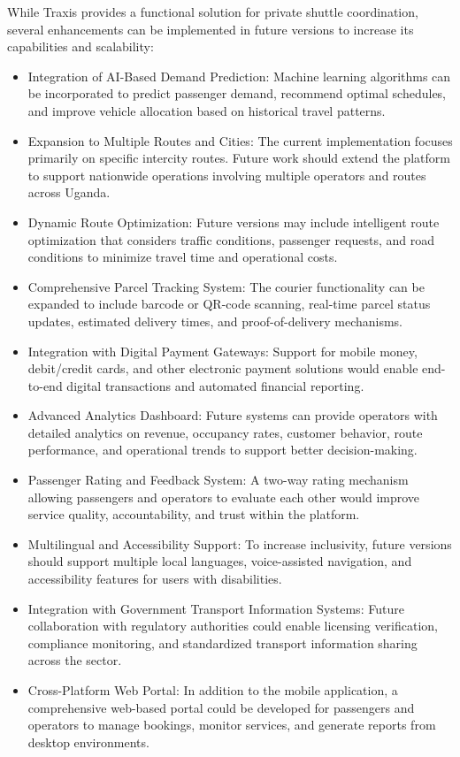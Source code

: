 While Traxis provides a functional solution for private shuttle coordination, several enhancements can be implemented in future versions to increase its capabilities and scalability:
\begin{itemize}

\item Integration of AI-Based Demand Prediction: Machine learning algorithms can be incorporated to predict passenger demand, recommend optimal schedules, and improve vehicle allocation based on historical travel patterns.

\item Expansion to Multiple Routes and Cities: The current implementation focuses primarily on specific intercity routes. Future work should extend the platform to support nationwide operations involving multiple operators and routes across Uganda.

\item Dynamic Route Optimization: Future versions may include intelligent route optimization that considers traffic conditions, passenger requests, and road conditions to minimize travel time and operational costs.

\item Comprehensive Parcel Tracking System: The courier functionality can be expanded to include barcode or QR-code scanning, real-time parcel status updates, estimated delivery times, and proof-of-delivery mechanisms.

\item Integration with Digital Payment Gateways: Support for mobile money, debit/credit cards, and other electronic payment solutions would enable end-to-end digital transactions and automated financial reporting.

\item Advanced Analytics Dashboard: Future systems can provide operators with detailed analytics on revenue, occupancy rates, customer behavior, route performance, and operational trends to support better decision-making.

\item Passenger Rating and Feedback System: A two-way rating mechanism allowing passengers and operators to evaluate each other would improve service quality, accountability, and trust within the platform.

\item Multilingual and Accessibility Support: To increase inclusivity, future versions should support multiple local languages, voice-assisted navigation, and accessibility features for users with disabilities.

\item Integration with Government Transport Information Systems: Future collaboration with regulatory authorities could enable licensing verification, compliance monitoring, and standardized transport information sharing across the sector.

\item Cross-Platform Web Portal: In addition to the mobile application, a comprehensive web-based portal could be developed for passengers and operators to manage bookings, monitor services, and generate reports from desktop environments.
\end{itemize}